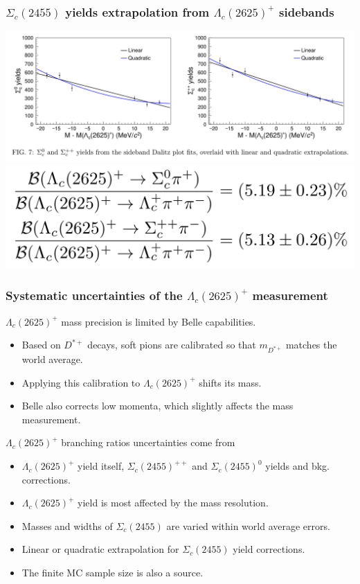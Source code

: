 \documentclass[10pt, aspectratio=169]{beamer}
\def\Dstarp{{D^{*+}}{}}
\def\LcII{{\Lambda_c(2625)^+}}
\def\ScI{{\Sigma_c(2455)}}
\def\ScIpp{{\Sigma_c(2455)^{++}}{}}
\def\ScIz{{\Sigma_c(2455)^{0}}{}}
\begin{document}
\begin{frame}[label=lc2625-sidebands-extrapol]%
  \frametitle{$\ScI$ yields extrapolation from $\LcII$ sidebands}
  \centering
  \includegraphics[width=.8\linewidth]{figures/005/fig2-007}
  \includegraphics[width=.4\linewidth]{figures/005/lc2625-br-statonly}
\end{frame}%

\begin{frame}[label=systematics-lc2625]%
  \frametitle{Systematic uncertainties of the $\LcII$ measurement}
  $\LcII$ mass precision is limited by Belle capabilities.
  \begin{itemize}
    \item Based on $\Dstarp$ decays, soft pions are calibrated
      so that $m_\Dstarp$ matches the world average.
    \item Applying this calibration to $\LcII$ shifts its mass.
    \item Belle also corrects low momenta, which slightly affects
      the mass measurement.
  \end{itemize}

  $\LcII$ branching ratios uncertainties come from
  \begin{itemize}
    \item $\LcII$ yield itself, $\ScIpp$ and $\ScIz$ yields
      and bkg. corrections.
    \item $\LcII$ yield is most affected by the mass resolution.
    \item Masses and widths of $\ScI$ are varied within
      world average errors.
    \item Linear or quadratic extrapolation for $\ScI$
      yield corrections.
    \item The finite MC sample size is also a source.
  \end{itemize}
\end{frame}%
\end{document}

